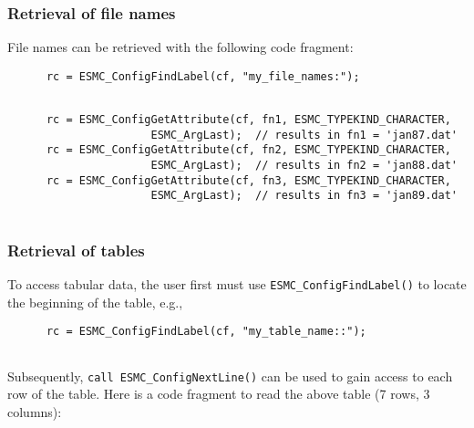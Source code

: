 
  \subsubsection{Retrieval of file names}
 
   File names can be retrieved with the following code fragment: 

 \begin{verbatim}
      rc = ESMC_ConfigFindLabel(cf, "my_file_names:");
 
\end{verbatim}
 

 \begin{verbatim}
      rc = ESMC_ConfigGetAttribute(cf, fn1, ESMC_TYPEKIND_CHARACTER,
                      ESMC_ArgLast);  // results in fn1 = 'jan87.dat'
      rc = ESMC_ConfigGetAttribute(cf, fn2, ESMC_TYPEKIND_CHARACTER,
                      ESMC_ArgLast);  // results in fn2 = 'jan88.dat'
      rc = ESMC_ConfigGetAttribute(cf, fn3, ESMC_TYPEKIND_CHARACTER,
                      ESMC_ArgLast);  // results in fn3 = 'jan89.dat'
 
\end{verbatim}
 

  \subsubsection{Retrieval of tables}
 
   To access tabular data, the user first must use
   {\tt ESMC\_ConfigFindLabel()} to locate the beginning of the table, e.g., 

 \begin{verbatim}
      rc = ESMC_ConfigFindLabel(cf, "my_table_name::");
 
\end{verbatim}
 

   Subsequently, {\tt call ESMC\_ConfigNextLine()} can be used to gain
   access to each row of the table. Here is a code fragment to read the above
   table (7 rows, 3 columns): 

